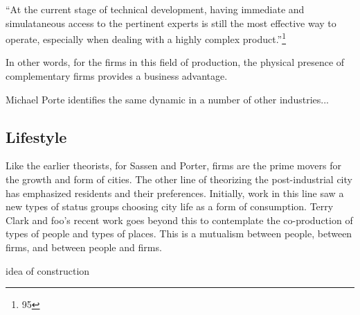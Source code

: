 ``At the current stage of technical development, having immediate and
simulataneous access to the pertinent experts is still the most
effective way to operate, especially when dealing with a highly
complex product.''\footnote{95}

In other words, for the firms in this field of production, the
physical presence of complementary firms provides a business
advantage.

Michael Porte identifies the same dynamic in a number of other
industries...

\subsection{Lifestyle}
Like the earlier theorists, for Sassen and Porter, firms are the prime
movers for the growth and form of cities. The other line of theorizing
the post-industrial city has emphasized residents and their
preferences. Initially, work in this line saw a new types of status
groups choosing city life as a form of consumption. Terry Clark and
foo's recent work goes beyond this to contemplate the co-production of
types of people and types of places. This is a mutualism between
people, between firms, and between people and firms.









\stiglitz idea of construction


